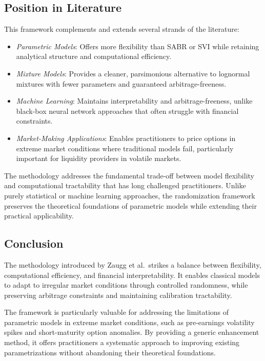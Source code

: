 \subsection{Position in Literature}

This framework complements and extends several strands of the literature:

\begin{itemize}
    \item \textit{Parametric Models}: Offers more flexibility than SABR or SVI while retaining analytical structure and computational efficiency.
    \item \textit{Mixture Models}: Provides a cleaner, parsimonious alternative to lognormal mixtures with fewer parameters and guaranteed arbitrage-freeness.
    \item \textit{Machine Learning}: Maintains interpretability and arbitrage-freeness, unlike black-box neural network approaches that often struggle with financial constraints.
    \item \textit{Market-Making Applications}: Enables practitioners to price options in extreme market conditions where traditional models fail, particularly important for liquidity providers in volatile markets.
\end{itemize}

The methodology addresses the fundamental trade-off between model flexibility and computational tractability that has long challenged practitioners. Unlike purely statistical or machine learning approaches, the randomization framework preserves the theoretical foundations of parametric models while extending their practical applicability.

\subsection{Conclusion}

The methodology introduced by Zaugg et al.\ strikes a balance between flexibility, computational efficiency, and financial interpretability. It enables classical models to adapt to irregular market conditions through controlled randomness, while preserving arbitrage constraints and maintaining calibration tractability.

The framework is particularly valuable for addressing the limitations of parametric models in extreme market conditions, such as pre-earnings volatility spikes and short-maturity option anomalies. By providing a generic enhancement method, it offers practitioners a systematic approach to improving existing parametrizations without abandoning their theoretical foundations.

